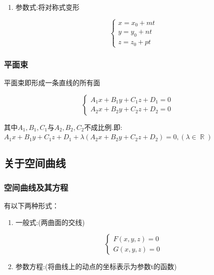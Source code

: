 \documentclass[UTF8,12pt]{ctexbook}
\DeclareMathOperator{\mathRealNumberCollection}{\mathbb{R}}
\begin{document}
{{{{\begin{enumerate}
{              设点$M(x,y,z),M_0(x_0,y_0,z_0)$是直线$L$上的任意两点,那么存在向量$\vec{M_0M}$与直线$L$的方向向量$\vec{s}$平行.因此两向量的对应坐标成比例.$(\vec{M_0M} = (x - x_0, y - y_0, z - z_0), \vec{s} = (m,n,p))$，因此得出:

              $\cfrac{x - x_0}{m} = \cfrac{y - y_0}{n} = \cfrac{z - z_0}{p} = t$
              }
        \item {
              参数式:将对称式变形

              $$
                \begin{cases}
                  x = x_0 + mt \\
                  y = y_0 + nt \\
                  z = z_0 + pt
                \end{cases}
              $$
              }
      \end{enumerate}
    }%

    \subsubsection{平面束}{
      平面束即形成一条直线的所有面

      $$
        \begin{cases}
          A_1x + B_1y + C_1z + D_1 = 0 \\
          A_2x + B_2y + C_2z + D_2 = 0
        \end{cases}
      $$

      其中$A_1,B_1,C_1$与$A_2,B_2,C_2$不成比例.即:$A_1x + B_1y + C_1z + D_1 + \lambda(A_2x + B_2y + C_2z + D_2) = 0, (\lambda \in \mathRealNumberCollection)$
    }%

  }%

  \subsection{关于空间曲线}{

    \subsubsection{空间曲线及其方程}{
      有以下两种形式：

      \begin{enumerate}
        \item {
              一般式:(两曲面的交线)

              $$
                \begin{cases}
                  F(x,y,z) = 0 \\
                  G(x,y,z) = 0
                \end{cases}
              $$
              }
        \item {
              参数方程:(将曲线上的动点的坐标表示为参数t的函数)

}
\end{enumerate}}}}}
\end{document}
